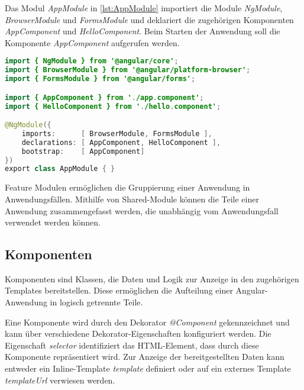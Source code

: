 Das Modul \textit{AppModule} in \autoref{lst:AppModule} importiert die Module \textit{NgModule}, \textit{BrowserModule} und \textit{FormsModule} und deklariert die zugehörigen Komponenten \textit{AppComponent} und \textit{HelloComponent}. Beim Starten der Anwendung soll die Komponente \textit{AppComponent} aufgerufen werden.

\begin{lstlisting}[caption=Das Root-Module in der Datei app.module.ts, label=lst:AppModule, language=Java]
import { NgModule } from '@angular/core';
import { BrowserModule } from '@angular/platform-browser';
import { FormsModule } from '@angular/forms';

import { AppComponent } from './app.component';
import { HelloComponent } from './hello.component';

@NgModule({
	imports:      [ BrowserModule, FormsModule ],
	declarations: [ AppComponent, HelloComponent ],
	bootstrap:    [ AppComponent]
})
export class AppModule { }

\end{lstlisting}

Feature Modulen ermöglichen die Gruppierung einer Anwendung in Anwendungsfällen. Mithilfe von Shared-Module können die Teile einer Anwendung zusammengefasst werden, die unabhängig vom Anwendungsfall verwendet werden können. \autocites[vgl.][528\psqq]{Freeman.2018}[vgl.][]{Google.c}[vgl.][105\psqq]{Steyer.2017}

\subsection{Komponenten}


Komponenten sind Klassen, die Daten und Logik zur Anzeige in den zugehörigen Templates bereitstellen. Diese ermöglichen die Aufteilung einer Angular-Anwendung in logisch getrennte Teile. \autocite[vgl.][401]{Freeman.2018} 

Eine Komponente wird durch den Dekorator \textit{@Component} gekennzeichnet und kann über verschiedene Dekorator-Eigenschaften konfiguriert werden. Die Eigenschaft \textit{selector} identifiziert das HTML-Element, dass durch diese Komponente repräsentiert wird. Zur Anzeige der bereitgestellten Daten kann entweder ein Inline-Template \textit{template} definiert oder auf ein externes Template \textit{templateUrl} verwiesen werden. \autocites[vgl.][]{Google.b}[vgl.][405]{Freeman.2018}[vgl.][47\psqq]{Steyer.2017}

